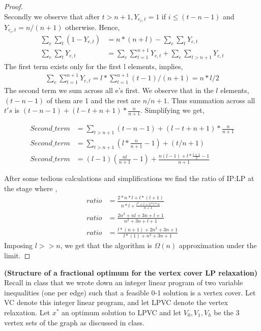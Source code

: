 \documentclass[solution,addpoints,12pt]{exam}
\begin{document}
\begin{questions}
\begin{parts}
\begin{solution}
\begin{proof}
  \\
  Secondly we observe that after $t>n+1, Y_{e_i,t} = 1$ if $i \leq (t-n-1)$ and $Y_{e_i,t} = n/(n+1)$ otherwise. Hence,
  \begin{align*}
  \sum_{e}\sum_{t}(1-Y_{e,t}) &= n*(n+l)-\sum_{e}\sum_{t}Y_{e,t}
  \\
  \sum_{e}\sum_{t}Y_{e,t} &= \sum_{e}\sum_{t=1}^{n+1}Y_{e,t} + \sum_{e}\sum_{t>n+1}Y_{e,t}
  \end{align*}
   The first term exists only for the first l elements, implies,
  \begin{align*}
  \sum_{e}\sum_{t=1}^{n+1}Y_{e,t} = l*\sum_{t=1}^{n+1}(t-1)/(n+1) = n*l/2
  \end{align*}
  The second term we sum across all e's first. We observe that in the $l$ elements, $(t-n-1)$ of them are 1 and the rest are $n/n+1$. Thus summation across all $t's$ is $(t-n-1)+(l-t+n+1)*\frac{n}{n+1}$.
  Simplifying we get,
  
  \begin{align*}
  Second\_term &= \sum_{t>n+1}(t-n-1)+(l-t+n+1)*\frac{n}{n+1}
  \\
  Second\_term &= \sum_{t>n+1}(l*\frac{n}{n+1}-1)+(t/n+1)
  \\
  Second\_term &= (l-1)(\frac{nl}{n+1}-1) + \frac{n(l-1)+l*\frac{l+1}{2}-1}{n+1}
  \end{align*}
  
  After some tedious calculations and simplifications we find the ratio of IP:LP at the stage where ,
  \begin{align*}
  ratio &= \frac{2*n*l+l*(l+1)}{n*l+\frac{l^2+l+2*l*n}{n+1}}
  \\
  ratio &= \frac{2n^2+nl+3n+l+1}{n^2+3n+l+1}
  \\
  ratio &= \frac{l*(n+1)+2n^2+3n+1}{l*(1)+n^2+3n+1}
  \end{align*}
  Imposing $l >> n$, we get that the algorithm is $\Omega(n)$ approximation under the limit.
  \end{proof}
  \end{solution}
\end{parts}

\question[30] \textbf{(Structure of a fractional optimum for the vertex cover LP relaxation)}
Recall in class that we wrote down an integer linear program of two variable inequalities (one per edge) such that a feasible 0-1 solution is a vertex cover.  Let VC denote this integer linear program, and let LPVC denote the vertex relaxation.  Let $x^*$ an optimum solution to LPVC and let $V_0, V_1, V_h$ be the 3 vertex sets of the graph as discussed in class.
\begin{parts}

\end{parts}
\end{questions}
\end{document}
